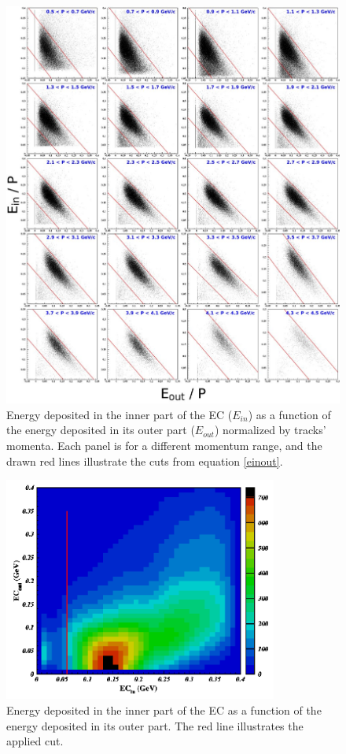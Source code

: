 \begin{figure}[p]
\centering
\includegraphics[width=14cm] {chap5-fig/fig02.jpg} 
\caption {Energy deposited in the inner part of the EC ($E_{in}$) as a function of the energy deposited in its outer part ($E_{out}$) normalized by tracks' momenta. Each panel is for a different momentum range, and the drawn red lines 
illustrate the cuts from equation \ref{einout}.}
\label{eleEC}
\end{figure}

\begin{figure}[tbp]
\centering
\includegraphics[width=9cm] {chap5-fig/fig03.png} 
\caption {Energy deposited in the inner part of the EC as a function of the 
energy deposited in its outer part. The red line illustrates the applied cut.}
\label{eleECi}
\end{figure}

